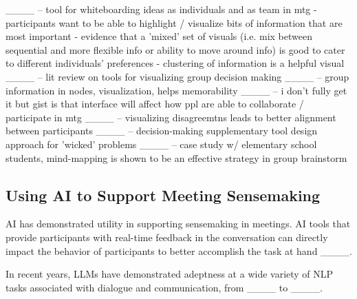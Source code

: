 ____ -- tool for whiteboarding ideas as individuals and as team in mtg
    - participants want to be able to highlight / visualize bits of information that are most important
    - evidence that a 'mixed' set of visuals (i.e. mix between sequential and more flexible info or ability to move around info) is good to cater to different individuals' preferences
    - clustering of information is a helpful visual
____ -- lit review on tools for visualizing group decision making
____ -- group information in nodes, visualization, helps memorability
____ -- i don't fully get it but gist is that interface will affect how ppl are able to collaborate / participate in mtg
____ -- visualizing disagreemtns leads to better alignment between participants
____ -- decision-making supplementary tool design approach for 'wicked' problems
____ -- case study w/ elementary school students, mind-mapping is shown to be an effective strategy in group brainstorm

\subsection{Using AI to Support Meeting Sensemaking}

AI has demonstrated utility in supporting sensemaking in meetings. AI tools that provide participants with real-time feedback in the conversation can directly impact the behavior of participants to better accomplish the task at hand ____. 

In recent years, LLMs have demonstrated adeptness at a wide variety of NLP tasks associated with dialogue and communication, from ____ to ____. 


